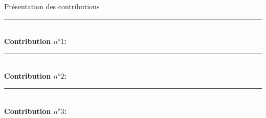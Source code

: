 \begin{frame}{Présentation des contributions}
    \noindent\color{Primary}\rule{\linewidth}{0.6pt}\color{black}\\
    \textbf{Contribution $n^o1$:\\}
    \noindent\color{Primary}\rule{\linewidth}{0.6pt}\color{black}\\
    \textbf{Contribution $n^o2$:\\}
    \noindent\color{Primary}\rule{\linewidth}{0.6pt}\color{black}\\
    \textbf{Contribution $n^o3$:\\}
\end{frame}